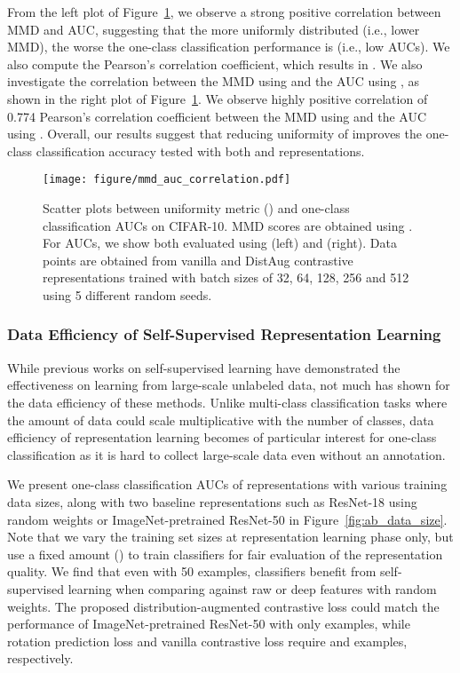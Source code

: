 \documentclass{article} \usepackage{iclr2021_conference,times}
\begin{document}
From the left plot of Figure~\ref{fig:supp_corr_uniform_vs_auc}, we observe a strong positive correlation between MMD and AUC, suggesting that the more uniformly distributed (i.e., lower MMD), the worse the one-class classification performance is (i.e., low AUCs). We also compute the Pearson's correlation coefficient, which results in . We also investigate the correlation between the MMD using  and the AUC using , as shown in the right plot of Figure~\ref{fig:supp_corr_uniform_vs_auc}. We observe highly positive correlation of 0.774 Pearson’s correlation coefficient between the MMD using  and the AUC using . Overall, our results suggest that reducing uniformity of  improves the one-class classification accuracy tested with both  and  representations. 

\begin{figure}[t]
    \centering
    \texttt{[image: figure/mmd\_auc\_correlation.pdf]}
    \caption{Scatter plots between uniformity metric () and one-class classification AUCs on CIFAR-10. MMD scores are obtained using . For AUCs, we show both evaluated using  (left) and  (right). Data points are obtained from vanilla and DistAug contrastive representations trained with batch sizes of 32, 64, 128, 256 and 512 using 5 different random seeds.}
    \label{fig:supp_corr_uniform_vs_auc}
\end{figure}


\subsubsection{Data Efficiency of Self-Supervised Representation Learning}
\label{sec:supp_ablation_data_efficiency}

While previous works on self-supervised learning have demonstrated the effectiveness on learning from large-scale unlabeled data, not much has shown for the data efficiency of these methods. Unlike multi-class classification tasks where the amount of data could scale multiplicative with the number of classes, data efficiency of representation learning becomes of particular interest for one-class classification as it is hard to collect large-scale data even without an annotation.

We present one-class classification AUCs of representations with various training data sizes, along with two baseline representations such as ResNet-18 using random weights or ImageNet-pretrained ResNet-50 in Figure~\ref{fig:ab_data_size}. Note that we vary the training set sizes at representation learning phase only, but use a fixed amount () to train classifiers for fair evaluation of the representation quality. We find that even with 50 examples, classifiers benefit from self-supervised learning when comparing against raw or deep features with random weights. The proposed distribution-augmented contrastive loss could match the performance of ImageNet-pretrained ResNet-50 with only  examples, while rotation prediction loss and vanilla contrastive loss require  and  examples, respectively.
\end{document}
